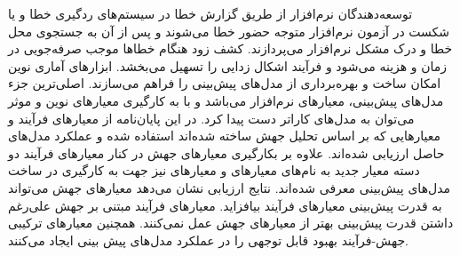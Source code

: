 
 توسعه‌دهندگان نرم‌افزار از طریق گزارش خطا در سیستم­‌های ردگیری خطا و یا شکست در آزمون نرم‌‌افزار متوجه حضور خطا می‌شوند و پس از آن به جستجوی محل خطا و درک مشکل  نرم‌‌افزار می‌‌پردازند. کشف زود هنگام خطاها موجب صرفه‌‌جویی در زمان و هزینه می­‌شود و فرآیند اشکال زدایی را تسهیل می‌­بخشد. ابزارهای آماری نوین امکان ساخت و بهره‌‌برداری از مدل‌های پیش‌بینی را فراهم می‌سازند. اصلی‌ترین جزء مدل‌های پیش‌بینی، معیارهای نرم‌افزار می‌باشد و با به کارگیری معیارهای نوین و موثر می‌توان به مدل‌های کاراتر دست پیدا کرد. در این پایان‌نامه از معیارهای فرآیند و معیارهایی که بر اساس تحلیل جهش ساخته شده‌اند استفاده شده  و عملکرد مدل‌های حاصل ارزیابی شده‌اند. علاوه بر بکارگیری معیارهای جهش در کنار معیارهای فرآیند دو دسته معیار جدید به نام‌های معیارهای  و معیارهای  نیز جهت به کارگیری در ساخت مدل‌های پیش‌بینی معرفی شده‌اند. نتایج ارزیابی نشان می‌دهد معیارهای جهش می‌تواند به قدرت پیش‌بینی معیارهای فرآیند بیافزاید. معیارهای فرآیند مبتنی بر جهش علی‌رغم داشتن قدرت پیش‌بینی بهتر از معیارهای جهش عمل نمی‌کنند. همچنین معیارهای ترکیبی جهش-فرآیند بهبود قابل توجهی را در عملکرد مدل‌های پیش بینی ایجاد می‌کنند. 
